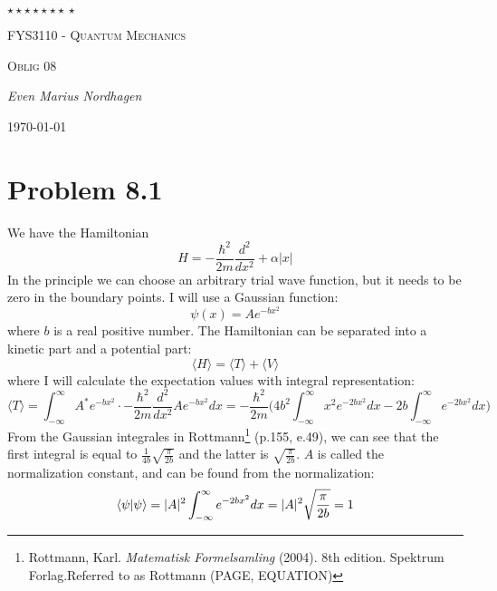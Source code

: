 \documentclass{scrartcl}
\begin{document}
\begin{titlepage}
	\centering
	{\scshape\LARGE $\star\star\star\star\star\star\star\,\star $  \par}
	\vspace{4cm}
	{\scshape\huge FYS3110 - Quantum Mechanics  \par}
	\vspace{1cm}
	{\scshape\Large Oblig 08\par}
	\vspace{2cm}
	{\Large\itshape Even Marius Nordhagen\par}
	\vfill
	{\large \today\par}
\end{titlepage}

\section*{Problem 8.1}
We have the Hamiltonian
\begin{equation}
H=-\frac{\hbar^2}{2m}\frac{d^2}{dx^2}+\alpha|x|
\end{equation}
In the principle we can choose an arbitrary trial wave function, but it needs to be zero in the boundary points. I will use a Gaussian function:
\begin{equation}
\psi(x)=Ae^{-bx^2}
\label{eq:trial}
\end{equation}
where $b$ is a real positive number. The Hamiltonian can be separated into a kinetic part and a potential part:
\begin{equation}
\langle H\rangle=\langle T\rangle+\langle V\rangle
\end{equation}
where I will calculate the expectation values with integral representation:
\begin{equation*}
\langle T\rangle = \int_{-\infty}^{\infty} A^*e^{-bx^2}\cdot -\frac{\hbar^2}{2m}\frac{d^2}{dx^2}Ae^{-bx^2}dx=-\frac{\hbar^2}{2m}\bigg(4b^2\int_{-\infty}^{\infty} x^2e^{-2bx^2}dx-2b\int_{-\infty}^{\infty} e^{-2bx^2}dx\bigg)
\end{equation*}
From the Gaussian integrales in Rottmann\footnote{Rottmann, Karl. \textit{Matematisk Formelsamling} (2004). 8th edition. Spektrum Forlag.\newline Referred to as Rottmann (PAGE, EQUATION)} (p.155, e.49), we can see that the first integral is equal to $\frac{1}{4b}\sqrt{\frac{\pi}{2b}}$ and the latter is $\sqrt{\frac{\pi}{2b}}$. $A$ is called the normalization constant, and can be found from the normalization:
\begin{equation*}
\braket{\psi}{\psi}=|A|^2\int_{-\infty}^{\infty} e^{-2bx^2}dx=|A|^2\sqrt{\frac{\pi}{2b}}=1
\end{equation*}
\end{document}
